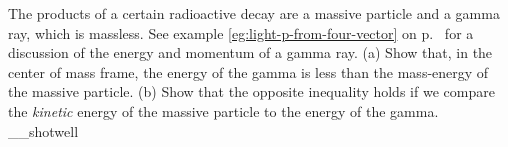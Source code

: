 The products of a certain radioactive decay are a massive particle and a gamma ray, which is massless.
See example \ref{eg:light-p-from-four-vector} on p.~\pageref{eg:light-p-from-four-vector}
for a discussion of the energy and momentum of a gamma ray.
(a) Show that, in the center of mass frame, the energy of the gamma is
less than the mass-energy of the massive particle.\hwendpart
(b) Show that the opposite inequality holds if we compare the \emph{kinetic} energy
of the massive particle to the energy of the gamma.
__shotwell
